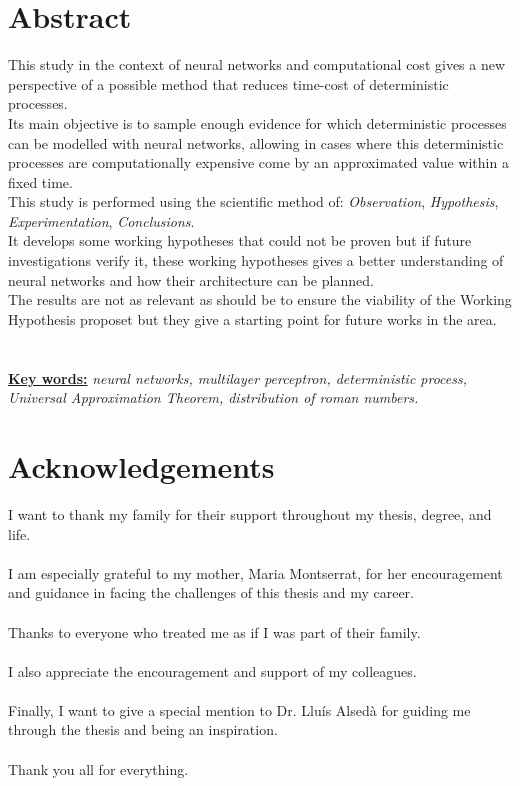 \documentclass[a4paper, 11pt]{article}
\begin{document}
\section*{Abstract}
This study in the context of neural networks and computational cost gives a new perspective of a possible method that reduces time-cost of deterministic processes.\\
Its main objective is to sample enough evidence for which deterministic processes can be modelled with neural networks, allowing in cases where this deterministic processes are computationally expensive come by an approximated value within a fixed time.\\
This study is performed using the scientific method of: \textit{Observation}, \textit{Hypothesis}, \textit{Experimentation}, \textit{Conclusions}.\\
It develops some working hypotheses that could not be proven but if future investigations verify it, these working hypotheses gives a better understanding of neural networks and how their architecture can be planned.\\
The results are not as relevant as should be to ensure the viability of the Working Hypothesis proposet but they give a starting point for future works in the area.\\
\textcolor{white}{a}\\
\textcolor{white}{a}\\
\underline{\textbf{Key words:}} \textit{neural networks, multilayer perceptron, deterministic process, Universal Approximation Theorem, distribution of roman numbers.}

\newpage
\section*{Acknowledgements}
I want to thank my family for their support throughout my thesis, degree, and life.\\
\textcolor{white}{a}\\
I am especially grateful to my mother, Maria Montserrat, for her encouragement and guidance in facing the challenges of this thesis and my career.\\
\textcolor{white}{a}\\
Thanks to everyone who treated me as if I was part of their family.\\
\textcolor{white}{a}\\
I also appreciate the encouragement and support of my colleagues.\\
\textcolor{white}{a}\\
Finally, I want to give a special mention to Dr. Lluís Alsedà for guiding me through the thesis and being an inspiration.\\
\textcolor{white}{a}\\
Thank you all for everything.
\newpage
\end{document}
